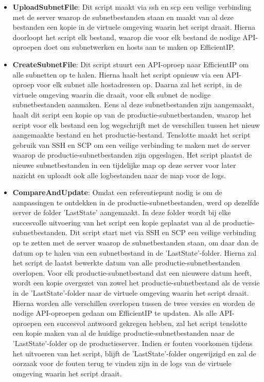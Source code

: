 \begin{itemize}
    \item \textbf{UploadSubnetFile}: Dit script maakt via \acrshort{ssh} en \acrshort{scp} een veilige verbinding met de server waarop de subnetbestanden staan en maakt van al deze bestanden een kopie in de virtuele omgeving waarin het script draait. Hierna doorloopt het script elk bestand, waarop die voor elk bestand de nodige API-oproepen doet om subnetwerken en hosts aan te maken op EfficientIP.
    \item \textbf{CreateSubnetFile}: Dit script stuurt een API-oproep naar EfficientIP om alle subnetten op te halen. Hierna haalt het script opnieuw via een API-oproep voor elk subnet alle hostadressen op. Daarna zal het script, in de virtuele omgeving waarin die draait, voor elk subnet de nodige subnetbestanden aanmaken. Eens al deze subnetbestanden zijn aangemaakt, haalt dit script een kopie op van de productie-subnetbestanden, waarop het script voor elk bestand een log wegschrijft met de verschillen tussen het nieuw aangemaakte bestand en het productie-bestand. Tenslotte maakt het script gebruik van SSH en SCP om een veilige verbinding te maken met de server waarop de productie-subnetbestanden zijn opgeslagen. Het script plaatst de nieuwe subnetbestanden in een tijdelijke map op deze server voor later nazicht en uploadt ook alle logbestanden naar de map voor de logs.
    \item \textbf{CompareAndUpdate}: Omdat een referentiepunt nodig is om de aanpassingen te ontdekken in de productie-subnetbestanden, werd op dezelfde server de folder 'LastState' aangemaakt. In deze folder wordt bij elke succesvolle uitvoering van het script een kopie geplaatst van al de productie-subnetbestanden. Dit script start met via SSH en SCP een veilige verbinding op te zetten met de server waarop de subnetbestanden staan, om daar dan de datum op te halen van een subnetbestand in de 'LastState'-folder. Hierna zal het script de laatst bewerkte datum van alle productie-subnetbestanden overlopen. Voor elk productie-subnetbestand dat een nieuwere datum heeft, wordt een kopie overgezet van zowel het productie-subnetbestand als de versie in de 'LastState'-folder naar de virtuele omgeving waarin het script draait. Hierna worden alle verschillen overlopen tussen de twee versies en worden de nodige API-oproepen gedaan om EfficientIP te updaten. Als alle API-oproepen een succesvol antwoord gekregen hebben, zal het script tenslotte een kopie maken van al de huidige productie-subnetbestanden naar de 'LastState'-folder op de productieserver. Indien er fouten voorkomen tijdens het uitvoeren van het script, blijft de 'LastState'-folder ongewijzigd en zal de oorzaak voor de fouten terug te vinden zijn in de logs van de virtuele omgeving waarin het script draait.
\end{itemize}

